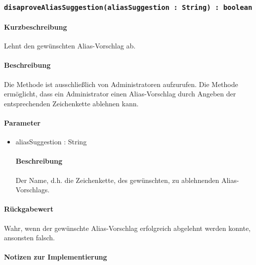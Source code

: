 \subsubsection{\texttt{disaproveAliasSuggestion(aliasSuggestion : String) : boolean}}%
\paragraph*{Kurzbeschreibung}
Lehnt den gewünschten Alias-Vorschlag ab.
\paragraph*{Beschreibung}
Die Methode ist ausschließlich von Administratoren aufzurufen.
Die Methode ermöglicht, dass ein Administrator einen Alias-Vorschlag durch Angeben der entsprechenden Zeichenkette ablehnen kann.
\paragraph*{Parameter}
\begin{itemize}
	\item aliasSuggestion : String
		\paragraph*{Beschreibung}
		Der Name, d.h. die Zeichenkette, des gewünschten, zu ablehnenden Alias-Vorschlags.
\end{itemize}
\paragraph*{Rückgabewert}
Wahr, wenn der gewünschte Alias-Vorschlag erfolgreich abgelehnt werden konnte, ansonsten falsch.

\paragraph*{Notizen zur Implementierung}%

